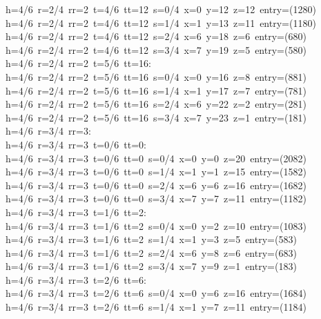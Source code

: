 \begin{tabbing}
h=4/6\ r=2/4\ rr=2\ t=4/6\ tt=12\ s=0/4\ x=0\ y=12\ z=12\ entry=(1280)\\[0pt]
h=4/6\ r=2/4\ rr=2\ t=4/6\ tt=12\ s=1/4\ x=1\ y=13\ z=11\ entry=(1180)\\[0pt]
h=4/6\ r=2/4\ rr=2\ t=4/6\ tt=12\ s=2/4\ x=6\ y=18\ z=6\ entry=(680)\\[0pt]
h=4/6\ r=2/4\ rr=2\ t=4/6\ tt=12\ s=3/4\ x=7\ y=19\ z=5\ entry=(580)\\[0pt]
h=4/6\ r=2/4\ rr=2\ t=5/6\ tt=16:\\[0pt]
h=4/6\ r=2/4\ rr=2\ t=5/6\ tt=16\ s=0/4\ x=0\ y=16\ z=8\ entry=(881)\\[0pt]
h=4/6\ r=2/4\ rr=2\ t=5/6\ tt=16\ s=1/4\ x=1\ y=17\ z=7\ entry=(781)\\[0pt]
h=4/6\ r=2/4\ rr=2\ t=5/6\ tt=16\ s=2/4\ x=6\ y=22\ z=2\ entry=(281)\\[0pt]
h=4/6\ r=2/4\ rr=2\ t=5/6\ tt=16\ s=3/4\ x=7\ y=23\ z=1\ entry=(181)\\[0pt]
h=4/6\ r=3/4\ rr=3:\\[0pt]
h=4/6\ r=3/4\ rr=3\ t=0/6\ tt=0:\\[0pt]
h=4/6\ r=3/4\ rr=3\ t=0/6\ tt=0\ s=0/4\ x=0\ y=0\ z=20\ entry=(2082)\\[0pt]
h=4/6\ r=3/4\ rr=3\ t=0/6\ tt=0\ s=1/4\ x=1\ y=1\ z=15\ entry=(1582)\\[0pt]
h=4/6\ r=3/4\ rr=3\ t=0/6\ tt=0\ s=2/4\ x=6\ y=6\ z=16\ entry=(1682)\\[0pt]
h=4/6\ r=3/4\ rr=3\ t=0/6\ tt=0\ s=3/4\ x=7\ y=7\ z=11\ entry=(1182)\\[0pt]
h=4/6\ r=3/4\ rr=3\ t=1/6\ tt=2:\\[0pt]
h=4/6\ r=3/4\ rr=3\ t=1/6\ tt=2\ s=0/4\ x=0\ y=2\ z=10\ entry=(1083)\\[0pt]
h=4/6\ r=3/4\ rr=3\ t=1/6\ tt=2\ s=1/4\ x=1\ y=3\ z=5\ entry=(583)\\[0pt]
h=4/6\ r=3/4\ rr=3\ t=1/6\ tt=2\ s=2/4\ x=6\ y=8\ z=6\ entry=(683)\\[0pt]
h=4/6\ r=3/4\ rr=3\ t=1/6\ tt=2\ s=3/4\ x=7\ y=9\ z=1\ entry=(183)\\[0pt]
h=4/6\ r=3/4\ rr=3\ t=2/6\ tt=6:\\[0pt]
h=4/6\ r=3/4\ rr=3\ t=2/6\ tt=6\ s=0/4\ x=0\ y=6\ z=16\ entry=(1684)\\[0pt]
h=4/6\ r=3/4\ rr=3\ t=2/6\ tt=6\ s=1/4\ x=1\ y=7\ z=11\ entry=(1184)\\[0pt]

\end{tabbing}
